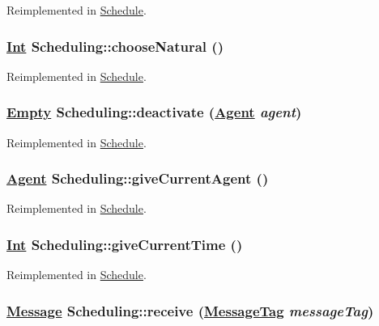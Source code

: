 Reimplemented in \hyperlink{classSchedule_a2}{Schedule}.\hypertarget{interfaceScheduling_a6}{
\subsubsection[chooseNatural]{\setlength{\rightskip}{0pt plus 5cm}\hyperlink{interfaceInt}{Int} Scheduling::choose\-Natural ()}}
\label{interfaceScheduling_a6}




Reimplemented in \hyperlink{classSchedule_a6}{Schedule}.\hypertarget{interfaceScheduling_a3}{
\subsubsection[deactivate]{\setlength{\rightskip}{0pt plus 5cm}\hyperlink{interfaceEmpty}{Empty} Scheduling::deactivate (\hyperlink{interfaceAgent}{Agent} {\em agent})}}
\label{interfaceScheduling_a3}




Reimplemented in \hyperlink{classSchedule_a3}{Schedule}.\hypertarget{interfaceScheduling_a4}{
\subsubsection[giveCurrentAgent]{\setlength{\rightskip}{0pt plus 5cm}\hyperlink{interfaceAgent}{Agent} Scheduling::give\-Current\-Agent ()}}
\label{interfaceScheduling_a4}




Reimplemented in \hyperlink{classSchedule_a4}{Schedule}.\hypertarget{interfaceScheduling_a5}{
\subsubsection[giveCurrentTime]{\setlength{\rightskip}{0pt plus 5cm}\hyperlink{interfaceInt}{Int} Scheduling::give\-Current\-Time ()}}
\label{interfaceScheduling_a5}




Reimplemented in \hyperlink{classSchedule_a5}{Schedule}.\hypertarget{interfaceScheduling_a1}{
\subsubsection[receive]{\setlength{\rightskip}{0pt plus 5cm}\hyperlink{interfaceMessage}{Message} Scheduling::receive (\hyperlink{interfaceMessageTag}{Message\-Tag} {\em message\-Tag})}}
\label{interfaceScheduling_a1}




